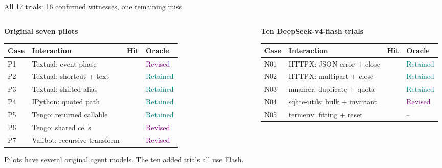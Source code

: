 \documentclass[aspectratio=169,11pt]{beamer}
\newcommand{\yes}{\textcolor{Teal}{\faIcon{check-circle}}}
\newcommand{\pending}{\textcolor{Amber}{\faIcon{exclamation-circle}}}
\newcommand{\Ret}{\textcolor{Teal}{Retained}}
\newcommand{\Rev}{\textcolor{Purple}{Revised}}
\begin{document}
\begin{frame}[t]{All 17 trials: 16 confirmed witnesses, one remaining miss}
  \setlength{\tabcolsep}{3pt}
  \begin{columns}[T,onlytextwidth]
    \begin{column}{.47\textwidth}
      \small\textbf{Original seven pilots}\par\vspace{1mm}
      \scriptsize\renewcommand{\arraystretch}{1.20}
      \begin{tabular}{@{}llcl@{}}
        \toprule Case & Interaction & Hit & Oracle\\\midrule
        P1 & Textual: event phase & \yes & \Rev\\
        P2 & Textual: shortcut + text & \yes & \Ret\\
        P3 & Textual: shifted alias & \yes & \Ret\\
        P4 & IPython: quoted path & \yes & \Ret\\
        P5 & Tengo: returned callable & \yes & \Ret\\
        P6 & Tengo: shared cells & \yes & \Rev\\
        P7 & Valibot: recursive transform & \yes & \Rev\\\bottomrule
      \end{tabular}
      \par\vspace{2mm}
      \scriptsize Pilots have several original agent models. The ten added trials all use Flash.
    \end{column}
    \begin{column}{.50\textwidth}
      \small\textbf{Ten DeepSeek-v4-flash trials}\par\vspace{1mm}
      \scriptsize\renewcommand{\arraystretch}{1.12}
      \begin{tabular}{@{}llcl@{}}
        \toprule Case & Interaction & Hit & Oracle\\\midrule
        N01 & HTTPX: JSON error + close & \yes & \Ret\\
        N02 & HTTPX: multipart + close & \yes & \Ret\\
        N03 & mnamer: duplicate + quota & \yes & \Ret\\
        N04 & sqlite-utils: bulk + invariant & \yes & \Rev\\
        N05 & termenv: fitting + reset & \pending & --\\

\end{tabular}
\end{column}
\end{columns}
\end{frame}
\end{document}
